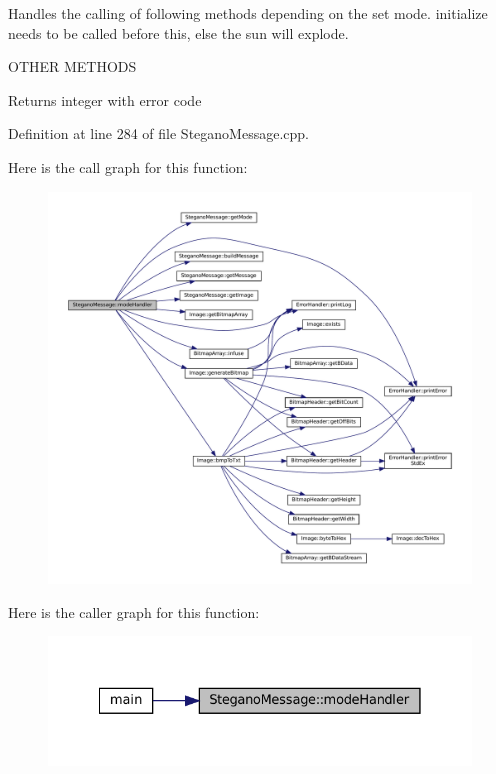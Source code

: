 Handles the calling of following methods depending on the set mode. initialize needs to be called before this, else the sun will explode. 

O\+T\+H\+ER M\+E\+T\+H\+O\+DS\begin{DoxyReturn}{Returns}
integer with error code 
\end{DoxyReturn}


Definition at line 284 of file Stegano\+Message.\+cpp.

Here is the call graph for this function\+:\nopagebreak
\begin{figure}[H]
\begin{center}
\leavevmode
\includegraphics[width=350pt]{classSteganoMessage_a2649e515941e730520b759282d00dcd6_cgraph}
\end{center}
\end{figure}
Here is the caller graph for this function\+:\nopagebreak
\begin{figure}[H]
\begin{center}
\leavevmode
\includegraphics[width=328pt]{classSteganoMessage_a2649e515941e730520b759282d00dcd6_icgraph}
\end{center}
\end{figure}
\mbox{\label{classSteganoMessage_a3ea3f5ff720bf56d33f168d47e2897b0}} 
